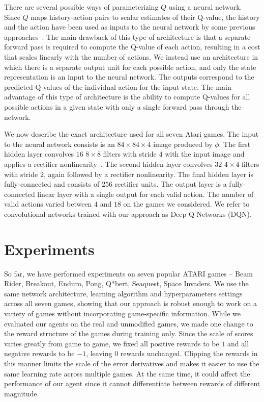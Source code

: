 \documentclass{article} %
\newcommand{\note}[1]{\textcolor{red}{\textbf{[Note: #1]}}}
\begin{document}
There are several possible ways of parameterizing $Q$ using a neural network.  Since $Q$ maps history-action pairs to scalar estimates of their Q-value, the history and the action have been used as inputs to the neural network by some previous approaches~\cite{riedmiller-nfq,lange:dfq}.  The main drawback of this type of architecture is that a separate forward pass is required to compute the Q-value of each action, resulting in a cost that scales linearly with the number of actions.  We instead use an architecture in which there is a separate output unit for each possible action, and only the state representation is an input to the neural network.  The outputs correspond to the predicted Q-values of the individual action for the input state.  The main advantage of this type of architecture is the ability to compute Q-values for all possible actions in a given state with only a single forward pass through the network. 

We now describe the exact architecture used for all seven Atari games.
The input to the neural network consists is an $84 \times 84 \times 4$ image produced by $\phi$.  The first hidden layer convolves $16$ $8 \times 8$ filters with stride $4$ with the input image and applies a rectifier nonlinearity~\cite{jarrett-best,nair-relu}.  The second hidden layer convolves $32$ $4\times 4$ filters with stride $2$, again followed by a rectifier nonlinearity.  The final hidden layer is fully-connected and consists of $256$ rectifier units.  The output layer is a fully-connected linear layer with a single output for each valid action.  The number of valid actions varied between $4$ and $18$ on the games we considered.  We refer to convolutional networks trained with our approach as Deep Q-Networks (DQN).

\section{Experiments}
\label{sec:experiments}

So far, we have performed experiments on seven popular ATARI games -- Beam Rider, Breakout, Enduro, Pong, Q*bert, Seaquest, Space Invaders. We use the same network architecture, learning algorithm and hyperparameters settings across all seven games, showing that our approach is robust enough to work on a variety of games without incorporating game-specific information. While we evaluated our agents on the real and unmodified games, we made one change to the reward structure of the games during training only.  Since the scale of scores varies greatly from game to game, we fixed all positive rewards to be $1$ and all negative rewards to be $-1$, leaving $0$ rewards unchanged.  Clipping the rewards in this manner limits the scale of the error derivatives and makes it easier to use the same learning rate across multiple games.  At the same time, it could affect the performance of our agent since it cannot differentiate between rewards of different magnitude.
\end{document}
